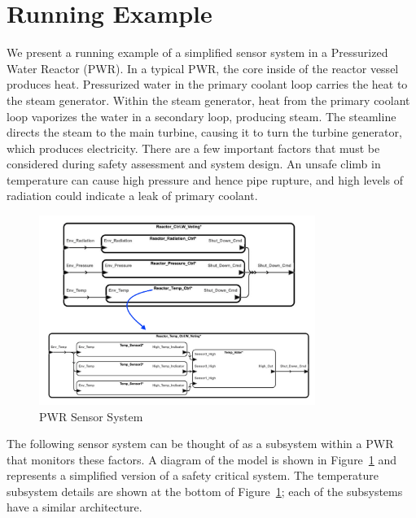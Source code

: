 \section{Running Example}
\label{sec:example}
We present a running example of a simplified sensor system in a Pressurized Water Reactor (PWR). In a typical PWR, the core inside of the reactor vessel produces heat. Pressurized water in the primary coolant loop carries the heat to the steam generator. Within the steam generator, heat from the primary coolant loop vaporizes the water in a secondary loop, producing steam. The steamline directs the steam to the main turbine, causing it to turn the turbine generator, which produces electricity. There are a few important factors that must be considered during safety assessment and system design. An unsafe climb in temperature can cause high pressure and hence pipe rupture, and high levels of radiation could indicate a leak of primary coolant. 

\begin{figure}[h!]
	\begin{center}
		\includegraphics[width=0.8\textwidth]{images/sensorSysAADL.png}
	\end{center}
	\vspace{-2em}
	\caption{PWR Sensor System}
	\label{fig:sensorSys}
\end{figure}

The following sensor system can be thought of as a subsystem within a PWR that monitors these factors. A diagram of the model is shown in Figure~\ref{fig:sensorSys} and represents a simplified version of a safety critical system. The temperature subsystem details are shown at the bottom of Figure~\ref{fig:sensorSys}; each of the subsystems have a similar architecture.

